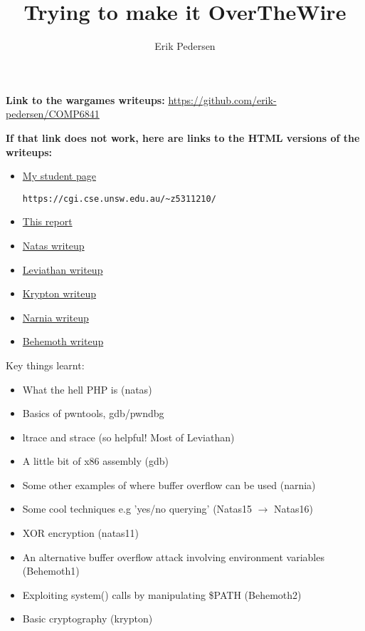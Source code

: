 \documentclass{article}
\title{Trying to make it OverTheWire}
\author{Erik Pedersen}
\begin{document}
\maketitle

\textbf{Link to the wargames writeups:}
\url{https://github.com/erik-pedersen/COMP6841}

\textbf{If that link does not work, here are links to the HTML versions of the writeups:}
\begin{itemize}
	\item	\href{https://cgi.cse.unsw.edu.au/~z5311210/}{My student page} \begin{verbatim}https://cgi.cse.unsw.edu.au/~z5311210/\end{verbatim}
	\item	\href{https://cgi.cse.unsw.edu.au/~z5311210/submission/report.pdf}{This report} 
	\item	\href{https://cgi.cse.unsw.edu.au/~z5311210/natas/natas_writeup.html}{Natas writeup} 
	\item	\href{https://cgi.cse.unsw.edu.au/~z5311210/leviathan/leviathan_writeup.html}{Leviathan writeup} 
	\item	\href{https://cgi.cse.unsw.edu.au/~z5311210/krypton/krypton_writeup.html}{Krypton writeup} 
	\item	\href{https://cgi.cse.unsw.edu.au/~z5311210/narnia/narnia_writeup.html}{Narnia writeup} 
	\item	\href{https://cgi.cse.unsw.edu.au/~z5311210/behemoth/behemoth_writeup.html}{Behemoth writeup} 
\end{itemize}

Key things learnt:
\begin{itemize}
	\item What the hell PHP is (natas)
	\item Basics of pwntools, gdb/pwndbg
	\item ltrace and strace (so helpful! Most of Leviathan)
	\item A little bit of x86 assembly (gdb)
	\item Some other examples of where buffer overflow can be used (narnia)
	\item Some cool techniques e.g 'yes/no querying' (Natas15 $\to$ Natas16)
	\item XOR encryption (natas11)
	\item An alternative buffer overflow attack involving environment variables (Behemoth1)
	\item Exploiting system() calls by manipulating \$PATH (Behemoth2)
	\item Basic cryptography (krypton)
\end{itemize}
\end{document}

